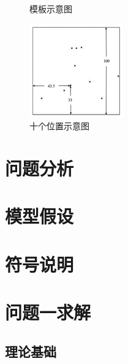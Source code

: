 \documentclass[12pt]{ctexart}
\begin{document}
\begin{figure}[htbp]
\begin{minipage}[t]{0.32\textwidth}
			\caption{模板示意图}
		\end{minipage}
		\begin{minipage}[t]{0.32\textwidth}
			\centering
			\includegraphics[width=\textwidth]{十个位置示意图.png}
			\caption{十个位置示意图}
		\end{minipage}
	\end{figure}
	
	
	
	\section{问题分析}
	
	\section{模型假设}
	
	\section{符号说明}
	
	\section{问题一求解}
	\subsection{理论基础}
	
\end{document}
